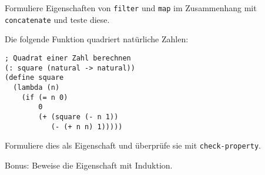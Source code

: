 \begin{aufgabe}
  Formuliere Eigenschaften von \lstinline{filter} und \lstinline{map}
  im Zusammenhang mit \lstinline{concatenate} und teste diese.
\end{aufgabe}

\begin{aufgabe}
Die folgende Funktion quadriert natürliche Zahlen:
%
\begin{lstlisting}
; Quadrat einer Zahl berechnen
(: square (natural -> natural))
(define square
  (lambda (n)
    (if (= n 0)
        0
        (+ (square (- n 1))
           (- (+ n n) 1)))))
\end{lstlisting}
%
Formuliere dies als Eigenschaft und überprüfe sie mit
\lstinline{check-property}.

Bonus: Beweise die Eigenschaft mit Induktion.
%
\end{aufgabe}


